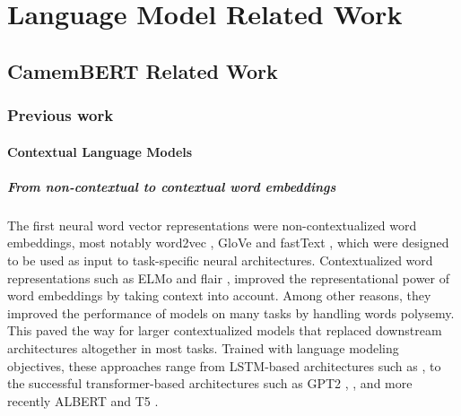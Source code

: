 \chapter{Language Model Related Work}


\section{CamemBERT Related Work}

\subsection{Previous work}
\label{relatedwork}
\subsubsection{Contextual Language Models}
\paragraph{From non-contextual to contextual word embeddings}
The first neural word vector representations were non-contextualized word embeddings, most notably
word2vec \citep{mikolov-etal-2013-distributed}, GloVe \cite{pennington-etal-2014-glove} and fastText \cite{mikolov-etal-2018-advances}, which were designed to be used as input to task-specific neural architectures.
Contextualized word representations such as ELMo \cite{peters-etal-2018-deep} and flair \cite{akbik-etal-2018-contextual}, improved the representational power of word embeddings by taking context into account. Among other reasons, they improved the performance of models on many tasks by handling words polysemy.
This paved the way for larger contextualized models that replaced downstream architectures altogether in most tasks. Trained with language modeling objectives, these approaches range from LSTM-based architectures such as \cite{dai-le-2015-semi}, to the successful transformer-based architectures such
as GPT2 \cite{radford-etal-2019-language}, \bert \cite{devlin-etal-2019-bert}, \roberta \cite{liu-etal-2019-roberta} and more recently ALBERT \cite{lan-etal-2020-albert} and T5 \cite{raffel-etal-2020-exploring}.


